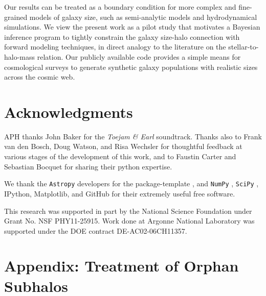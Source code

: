 \documentclass[usenatbib,usegraphicx,letterpaper]{mn2e}
\begin{document}
Our results can be treated as a boundary condition for more complex and fine-grained models of galaxy size, such as semi-analytic models and hydrodynamical simulations. We view the present work as a pilot study that motivates a Bayesian inference program to tightly constrain the galaxy size-halo connection with forward modeling techniques, in direct analogy to the literature on the stellar-to-halo-mass relation. Our publicly available code provides a simple means for cosmological surveys to generate synthetic galaxy populations with realistic sizes across the cosmic web.

\section*{Acknowledgments}

APH thanks John Baker for the {\em Toejam \& Earl} soundtrack. Thanks also to Frank van den Bosch, Doug Watson, and Risa Wechsler for thoughtful feedback at various stages of the development of this work, and to Faustin Carter and Sebastian Bocquet for sharing their python expertise. 

We thank the {\tt Astropy} developers for the package-template \citep{astropy}, and {\tt NumPy} \citep{numpy_ndarray}, {\tt SciPy} \citep{scipy}, IPython, Matplotlib, and GitHub for their extremely useful free software.

This research was supported in part by the National Science Foundation under Grant No. NSF PHY11-25915. Work done at Argonne National Laboratory was supported under the DOE contract DE-AC02-06CH11357.



\section*{Appendix: Treatment of Orphan Subhalos}
\end{document}
